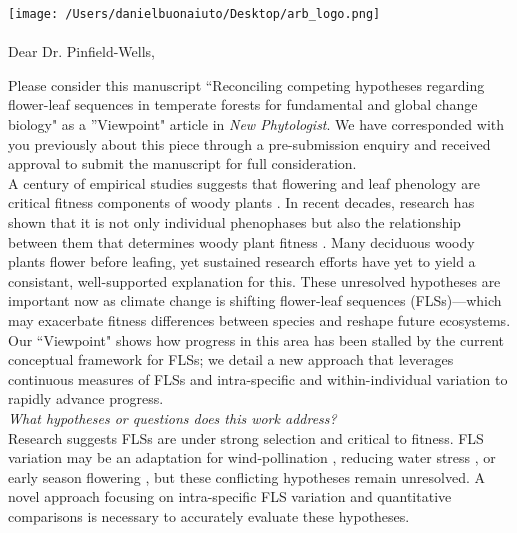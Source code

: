 \documentclass[11pt,a4paper]{article}\usepackage[]{graphicx}\usepackage[]{color}
\begin{document}

\def\labelitemi{--}
\parindent=24pt
\texttt{[image: /Users/danielbuonaiuto/Desktop/arb\_logo.png]}
\\\\

{Dear Dr. Pinfield-Wells,}\\
\vspace{1.5ex}

\noindent Please consider this manuscript ``Reconciling competing hypotheses regarding flower-leaf sequences in temperate forests for fundamental and global change biology" as a ''Viewpoint" article in \textit{New Phytologist}. We have corresponded with you previously about this piece through a pre-submission enquiry and received approval to submit the manuscript for full consideration.\\

\noindent A century of empirical studies suggests that flowering and leaf phenology are critical fitness components of woody plants \citep{Munguia-Rosas2011,Forrest2010}. In recent decades, research has shown that it is not only individual phenophases but also the relationship between them that determines woody plant fitness \citep{Menzel1999,Ettinger2018}. Many deciduous woody plants flower before leafing, yet sustained research efforts have yet to yield a consistant, well-supported explanation for this. These unresolved hypotheses are important now as climate change is shifting flower-leaf sequences (FLSs)---which may exacerbate fitness differences between species and reshape future ecosystems. Our ``Viewpoint" shows how progress in this area has been stalled by the current conceptual framework for FLSs; we detail a new approach that leverages continuous measures of FLSs and intra-specific and within-individual variation to rapidly advance progress.\\

\noindent \emph{What hypotheses or questions does this work address?}\\
\noindent Research suggests FLSs are under strong selection and critical to fitness. FLS variation may be an adaptation for wind-pollination \citep{Rathcke_1985}, reducing water stress \citep{Gougherty2018,Reich1984}, or early season flowering \citep{Primack1987}, but these conflicting hypotheses remain unresolved. A novel approach focusing on intra-specific FLS variation and quantitative comparisons is necessary to accurately evaluate these hypotheses.\\
\end{document}
